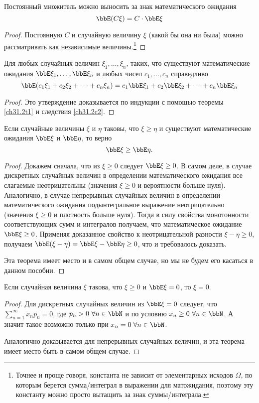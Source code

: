 \begin{cons}\label{ch31.2c2}
Постоянный множитель можно выносить за знак математического ожидания
$$
\bbE(C\xi)=C\cdot \bbE\xi
$$
\end{cons}
\begin{proof}
Постоянную $C$ и случайную величину $\xi$ (какой бы она ни была) можно рассматривать как независимые величины.\footnote{Точнее и проще говоря, константа не зависит от элементарных исходов $\Omega$, по которым берется сумма/интеграл в выражении для матожидания, поэтому эту константу можно просто вытащить за знак суммы/интеграла.}
\end{proof}
\begin{cons}[линейность] Для любых случайных величин $\xi_1,\dots,\xi_n$, таких, что существуют математические ожидания $\bbE\xi_1,\dots, \bbE\xi_n$ и любых чисел $c_1,\dots, c_n$ справедливо
$$
\bbE(c_1\xi_1+c_2\xi_2+\dots+c_n\xi_n) = c_1\bbE\xi_1+c_2\bbE\xi_2+\dots+c_n\bbE\xi_n
$$
\end{cons}
\begin{proof} Это утверждение доказывается по индукции с помощью теоремы \ref{ch31.2t1} и следствия \ref{ch31.2c2}.
\end{proof}
\begin{thm}[монотонность] \label{ch31.2t4}
Если случайные величины $\xi$ и $\eta$ таковы, что $\xi \ge\eta$ и существуют математические ожидания $\bbE\xi$ и $\bbE\eta$, то верно
$$
\bbE\xi\ge \bbE\eta.
$$
\end{thm}
\begin{proof}
Докажем сначала, что из $\xi\ge 0$ следует $\bbE\xi\ge0$. В самом деле, в случае дискретных случайных величин в определении математического ожидания все слагаемые неотрицательны (значения $\xi \ge 0$ и вероятности больше нуля). Аналогично, в случае непрерывных случайных величин в определении математического ожидания подынтегральное выражение неотрицательно (значения $\xi \ge 0$ и плотность больше нуля). Тогда в силу свойства монотонности соответствующих сумм и интегралов получаем, что математическое ожидание $\bbE\xi \ge 0$. Применяя доказанное свойство к неотрицательной разности $\xi-\eta \ge 0$, получаем $\bbE(\xi-\eta)=\bbE\xi-\bbE\eta\ge0$, что и требовалось доказать.

Эта теорема имеет место и в самом общем случае, но мы не будем его касаться в данном пособии.
\end{proof}
\begin{thm}\label{ch31.2t3}
Если случайная величина $\xi$ такова, что $\xi\ge 0$ и $\bbE\xi=0$, то $\xi=0$.
\end{thm}
\begin{proof}
Для дискретных случайных величин из $\bbE\xi=0$ следует, что $\sum\limits_{n=1}^{\infty} x_n p_n = 0$, где $p_n > 0 \ \forall n\in \bbN$ и по условию $x_n \ge 0 \ \forall n\in \bbN$. А значит такое возможно только при $x_n = 0 \; \forall n\in \bbN$.

Аналогично доказывается для непрерывных случайных величин, и эта теорема имеет место быть в самом общем случае.
\end{proof}

